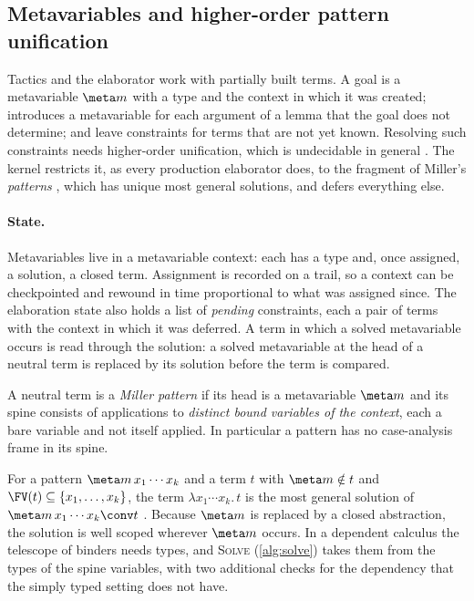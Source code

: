 \subsection{Metavariables and higher-order pattern unification}\label{sec:miller}

Tactics and the elaborator work with partially built terms.
A goal is a metavariable $\meta m$ with a type and the context in which it was created;  introduces a metavariable for each argument of a lemma that the goal does not determine;  and  leave constraints for terms that are not yet known.
Resolving such constraints needs higher-order unification, which is undecidable in general \citep{huet75}.
The kernel restricts it, as every production elaborator does, to the fragment of Miller's \emph{patterns} \citep{miller91,nipkow93}, which has unique most general solutions, and defers everything else.

\paragraph{State.}
Metavariables live in a metavariable context: each has a type and, once assigned, a solution, a closed term.
Assignment is recorded on a trail, so a context can be checkpointed and rewound in time proportional to what was assigned since.
The elaboration state also holds a list of \emph{pending} constraints, each a pair of terms with the context in which it was deferred.
A term in which a solved metavariable occurs is read through the solution: a solved metavariable at the head of a neutral term is replaced by its solution before the term is compared.

\begin{definition}[Pattern]\label{def:pattern}
A neutral term is a \emph{Miller pattern} if its head is a metavariable $\meta m$ and its spine consists of applications to \emph{distinct bound variables of the context}, each a bare variable and not itself applied.
In particular a pattern has no case-analysis frame in its spine.
\end{definition}

For a pattern $\meta m\,x_1\cdots x_k$ and a term $t$ with $\meta m\notin t$ and $\FV(t)\subseteq\{x_1,\dots,x_k\}$, the term $\lambda x_1\cdots x_k.\,t$ is the most general solution of $\meta m\,x_1\cdots x_k \conv t$ \citep{miller91}.
Because $\meta m$ is replaced by a closed abstraction, the solution is well scoped wherever $\meta m$ occurs.
In a dependent calculus the telescope of binders needs types, and \textsc{Solve} (\cref{alg:solve}) takes them from the types of the spine variables, with two additional checks for the dependency that the simply typed setting does not have.

